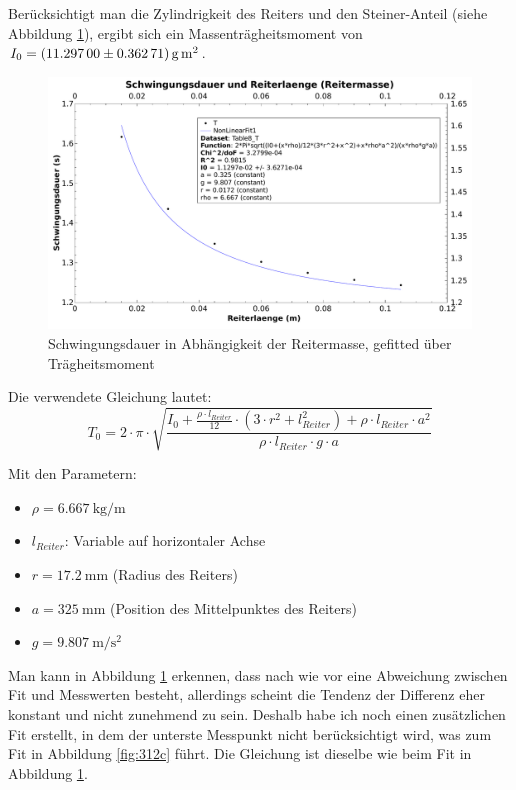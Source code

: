 \clearpage
Ber\"ucksichtigt  man die  Zylindrigkeit  des Reiters  und den  Steiner-Anteil
(siehe Abbildung \ref{fig:312b}), ergibt sich ein Massentr\"agheitsmoment von
$I_0  = \SI[separate-uncertainty = true]{11.297 \pm 0.36271}{\gram\meter\squared}$.

\begin{figure}[h!]
    \centering
    \includegraphics[width=\textwidth]{images/312b.pdf}
    \caption{%
        Schwingungsdauer in Abh\"angigkeit der Reitermasse, gefitted \"uber Tr\"agheitsmoment
    }
    \label{fig:312b}
\end{figure}

Die verwendete Gleichung lautet:
\begin{equation}
    T_0 = 2 \cdot \pi \cdot \sqrt{\frac{I_0 + \frac{\rho \cdot l_{Reiter}}{12} \cdot (3\cdot r^2 + l_{Reiter}^2) + \rho \cdot l_{Reiter} \cdot a^2}{\rho \cdot l_{Reiter} \cdot g \cdot a}}
\end{equation}

Mit den Parametern:
\begin{itemize}
    \item
        $\rho = \SI{6.667}{\kilo\gram\per\meter}$
    \item
        $l_{Reiter}$: Variable auf horizontaler Achse
    \item
        $r = \SI{17.2}{\milli\meter}$ (Radius des Reiters)
    \item
        $a = \SI{325}{\milli\meter}$ (Position des Mittelpunktes des Reiters)
    \item
        $g = \SI{9.807}{\meter\per\second\squared}$
\end{itemize}
\clearpage
Man  kann  in  Abbildung  \ref{fig:312b}  erkennen, dass  nach  wie  vor  eine
Abweichung zwischen Fit und Messwerten besteht, allerdings scheint die Tendenz
der Differenz eher konstant und nicht zunehmend zu sein. Deshalb habe ich noch
einen  zus\"atzlichen  Fit  erstellt,  in dem  der  unterste  Messpunkt  nicht
ber\"ucksichtigt wird, was zum Fit in Abbildung \ref{fig:312c} f\"uhrt. Die Gleichung
ist dieselbe wie beim Fit in Abbildung \ref{fig:312b}.

